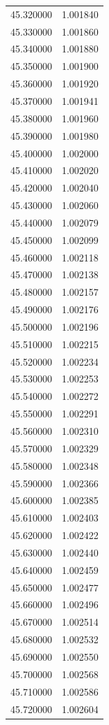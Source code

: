 \begin{tabular}{rr}
45.320000 & 1.001840 \\
45.330000 & 1.001860 \\
45.340000 & 1.001880 \\
45.350000 & 1.001900 \\
45.360000 & 1.001920 \\
45.370000 & 1.001941 \\
45.380000 & 1.001960 \\
45.390000 & 1.001980 \\
45.400000 & 1.002000 \\
45.410000 & 1.002020 \\
45.420000 & 1.002040 \\
45.430000 & 1.002060 \\
45.440000 & 1.002079 \\
45.450000 & 1.002099 \\
45.460000 & 1.002118 \\
45.470000 & 1.002138 \\
45.480000 & 1.002157 \\
45.490000 & 1.002176 \\
45.500000 & 1.002196 \\
45.510000 & 1.002215 \\
45.520000 & 1.002234 \\
45.530000 & 1.002253 \\
45.540000 & 1.002272 \\
45.550000 & 1.002291 \\
45.560000 & 1.002310 \\
45.570000 & 1.002329 \\
45.580000 & 1.002348 \\
45.590000 & 1.002366 \\
45.600000 & 1.002385 \\
45.610000 & 1.002403 \\
45.620000 & 1.002422 \\
45.630000 & 1.002440 \\
45.640000 & 1.002459 \\
45.650000 & 1.002477 \\
45.660000 & 1.002496 \\
45.670000 & 1.002514 \\
45.680000 & 1.002532 \\
45.690000 & 1.002550 \\
45.700000 & 1.002568 \\
45.710000 & 1.002586 \\
45.720000 & 1.002604 \\

\end{tabular}

